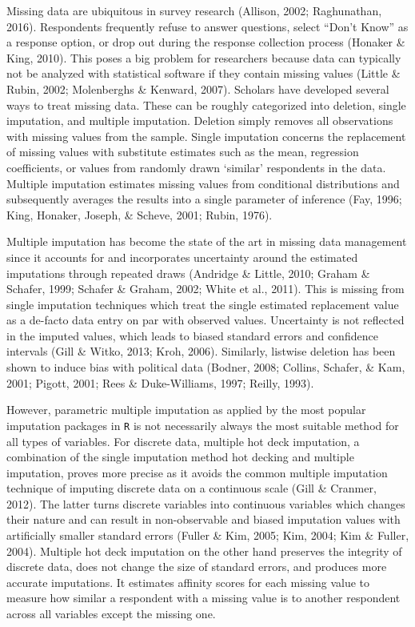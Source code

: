 \documentclass[12pt,econ]{sources/authesis}
\begin{document}
Missing data are ubiquitous in survey research (Allison, 2002; Raghunathan, 2016). Respondents frequently refuse to answer questions, select ``Don't Know'' as a response option, or drop out during the response collection process (Honaker \& King, 2010). This poses a big problem for researchers because data can typically not be analyzed with statistical software if they contain missing values (Little \& Rubin, 2002; Molenberghs \& Kenward, 2007). Scholars have developed several ways to treat missing data. These can be roughly categorized into deletion, single imputation, and multiple imputation. Deletion simply removes all observations with missing values from the sample. Single imputation concerns the replacement of missing values with substitute estimates such as the mean, regression coefficients, or values from randomly drawn `similar' respondents in the data. Multiple imputation estimates missing values from conditional distributions and subsequently averages the results into a single parameter of inference (Fay, 1996; King, Honaker, Joseph, \& Scheve, 2001; Rubin, 1976).

Multiple imputation has become the state of the art in missing data management since it accounts for and incorporates uncertainty around the estimated imputations through repeated draws (Andridge \& Little, 2010; Graham \& Schafer, 1999; Schafer \& Graham, 2002; White et al., 2011). This is missing from single imputation techniques which treat the single estimated replacement value as a de-facto data entry on par with observed values. Uncertainty is not reflected in the imputed values, which leads to biased standard errors and confidence intervals (Gill \& Witko, 2013; Kroh, 2006). Similarly, listwise deletion has been shown to induce bias with political data (Bodner, 2008; Collins, Schafer, \& Kam, 2001; Pigott, 2001; Rees \& Duke-Williams, 1997; Reilly, 1993).

However, parametric multiple imputation as applied by the most popular imputation packages in \texttt{R} is not necessarily always the most suitable method for all types of variables. For discrete data, multiple hot deck imputation, a combination of the single imputation method hot decking and multiple imputation, proves more precise as it avoids the common multiple imputation technique of imputing discrete data on a continuous scale (Gill \& Cranmer, 2012). The latter turns discrete variables into continuous variables which changes their nature and can result in non-observable and biased imputation values with artificially smaller standard errors (Fuller \& Kim, 2005; Kim, 2004; Kim \& Fuller, 2004). Multiple hot deck imputation on the other hand preserves the integrity of discrete data, does not change the size of standard errors, and produces more accurate imputations. It estimates affinity scores for each missing value to measure how similar a respondent with a missing value is to another respondent across all variables except the missing one.
\end{document}
